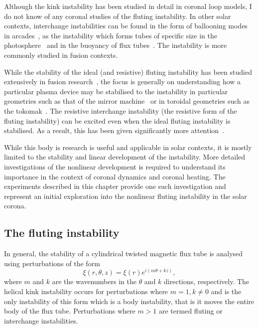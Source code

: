 Although the kink instability has been studied in detail in coronal loop models, I do not know of any coronal studies of the fluting instability. In other solar contexts, interchange instabilities can be found in the form of ballooning modes in arcades~\cite{hoodBallooningInstabilitiesSolar1986}, as the instability which forms tubes of specific size in the photosphere~\cite{bunteInterchangeInstabilitySolar1993} and in the buoyancy of flux tubes~\cite{schuesslerInterchangeInstabilitySmall1984}. The instability is more commonly studied in fusion contexts.

While the stability of the ideal (and resistive) fluting instability has been studied extensively in fusion research~\cite{mikhailovskiiInstabilitiesConfinedPlasma1998,zhengAdvancedTokamakStability2015,wessonHydromagneticStabilityTokamaks1978}, the focus is generally on understanding how a particular plasma device may be stabilised to the instability in particular geometries such as that of the mirror machine~\cite{jungwirthTheoryFluteInstability1965} or in toroidal geometries such as the tokomak~\cite{shafranovFluteInstabilityCurrentcarrying1968}. The resistive interchange instability (the resistive form of the fluting instability) can be excited even when the ideal fluting instability is stabilised. As a result, this has been given significantly more attention~\cite{johnsonResistiveInterchangesNegativeV1967,correa-restrepoResistiveBallooningModes1983}.

While this body is research is useful and applicable in solar contexts, it is mostly limited to the stability and linear development of the instability. More detailed investigations of the nonlinear development is required to understand its importance in the context of coronal dynamics and coronal heating. The experiments described in this chapter provide one such investigation and represent an initial exploration into the nonlinear fluting instability in the solar corona.

\subsection{The fluting instability}

In general, the stability of a cylindrical twisted magnetic flux tube is analysed using perturbations of the form
\begin{equation}
  \label{eq:kink_perturbation}
\xi(r, \theta, z) = \xi(r) e^{i(m\theta + kz)},
\end{equation}
where $m$ and $k$ are the wavenumbers in the $\theta$ and $k$ directions, respectively. The helical kink instability occurs for perturbations where $m=1, k\ne0$ and is the only instability of this form which is a body instability, that is it moves the entire body of the flux tube. Perturbations where $m>1$ are termed fluting or interchange instabilities.

